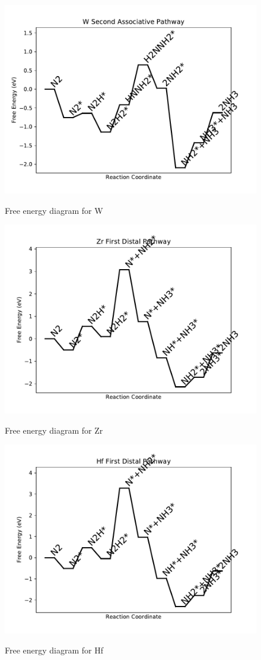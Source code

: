 \documentclass[journal=jacsat,manuscript=article]{achemso}
\begin{document}
\begin{figure}
\includegraphics[width=1\linewidth]{data/plots/W_associative_2.pdf}
\label{fig:W_associative_2}
\caption{Free energy diagram for W}
\end{figure}

\newpage
\begin{figure}
\includegraphics[width=1\linewidth]{data/plots/Zr_distal_1.pdf}
\label{fig:Zr_distal_1}
\caption{Free energy diagram for Zr}
\end{figure}

\begin{figure}
\includegraphics[width=1\linewidth]{data/plots/Hf_distal_1.pdf}
\label{fig:Hf_distal_1}
\caption{Free energy diagram for Hf}
\end{figure}
\end{document}
